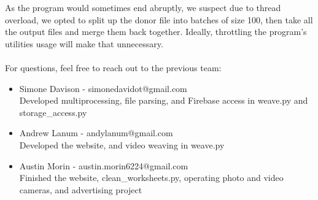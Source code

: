 \documentclass{article}
\begin{document}
As the program would sometimes end abruptly, we suspect due to thread overload, we opted to split up the donor file into batches of size 100, then take all the output files and merge them back together. Ideally, throttling the program's utilities usage will make that unnecessary.\\
\\
For questions, feel free to reach out to the previous team:
\begin{itemize}
    \item Simone Davison - simonedavidot@gmail.com\\
    Developed multiprocessing, file parsing, and Firebase access in weave.py and storage\_access.py
    \item Andrew Lanum - andylanum@gmail.com\\
    Developed the website, and video weaving in weave.py
    \item Austin Morin - austin.morin6224@gmail.com\\
    Finished the website, clean\_worksheets.py, operating photo and video cameras, and advertising project
\end{itemize}
\end{document}
